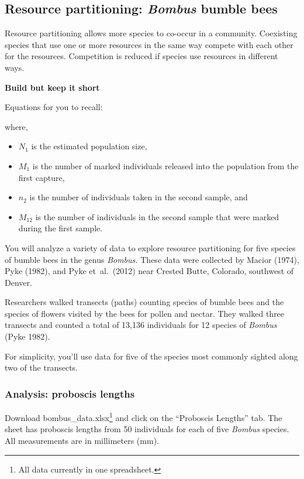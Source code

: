 \documentclass[12pt, hidelinks]{exam}
\begin{document}
\subsection*{Resource partitioning: \textit{Bombus} bumble bees}

Resource partitioning allows more species to co-occur in a community.
Coexisting species that use one or more resources in the same way compete
with each other for the resources. Competition is reduced if species
use resources in different ways.

\textbf{Build but keep it short}

Equations for you to recall:


where,

\begin{itemize}
	\item $N_1$ is the estimated population size,
	\item $M_1$ is the number of marked individuals released into the
	population from the first capture,
	\item $n_2$ is the number of
	individuals taken in the second sample, and
	\item $M_{12}$ is the
	number of individuals in the second sample that were marked during the
	first sample.
\end{itemize}


You will analyze a variety of data to explore resource partitioning for five
species of bumble bees in the genus \textit{Bombus.} These data were collected
by Macior (1974), Pyke (1982), and Pyke et~al.~(2012) near Crested Butte, Colorado,
southwest of Denver. 

Researchers walked transects (paths) counting species of bumble bees and the 
species of flowers visited by the bees for pollen and nectar. They walked
three transects and counted a total of 13,136 individuals for 12 species of 
\textit{Bombus} (Pyke 1982).

For simplicity, you'll use data for five of the species most commonly sighted along two of the transects.


\subsubsection*{Analysis: proboscis lengths}

Download bombus\_data.xlsx\footnote{All data currently in one
spreadsheet.} and click on the “Proboscis Lengths” tab. The sheet
has proboscis lengths from 50 individuals for each of five \textit{Bombus} species. All measurements are in millimeters (mm).
\end{document}
